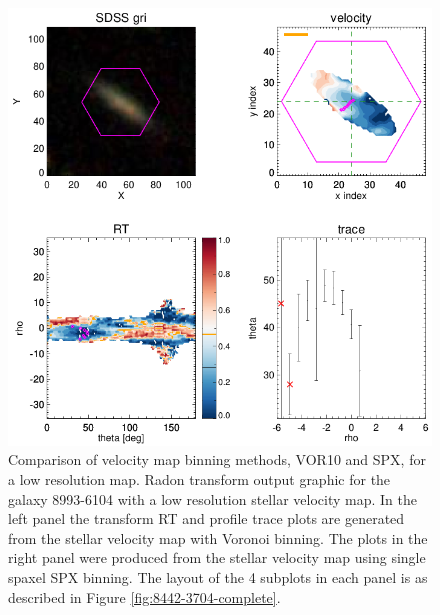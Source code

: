 \begin{figure}
    \includegraphics[width=\columnwidth]{images/RadonPlots/RT-SNIPS-NEW/8993-6104-SPX-MILESHC-MILESHC-1-SNIP.png}
    \caption[Comparison of velocity map binning schemes for a low resolution map]{Comparison of velocity map binning methods, VOR10 and SPX, for a low resolution map. Radon transform output graphic for the galaxy 8993-6104 with a low resolution stellar velocity map. In the left panel the transform RT and profile trace plots are generated from the stellar velocity map with Voronoi binning. The plots in the right panel were produced from the stellar velocity map using single spaxel SPX binning. The layout of the 4 subplots in each panel is as described in Figure \ref{fig:8442-3704-complete}.}
    \label{fig:binning-comparison2}
\end{figure}


